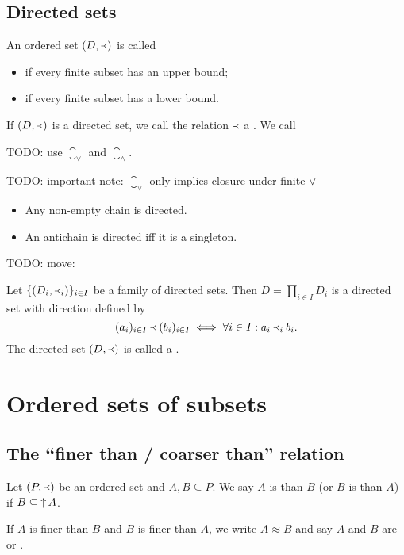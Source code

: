 \subsection{Directed sets}
\begin{definition}
An ordered set $(D,\Yleft)$ is called
\begin{itemize}
\item {} if every finite subset has an upper bound;
\item {} if every finite subset has a lower bound.
\end{itemize}
If $(D,\Yleft)$ is a directed set, we call the relation $\Yleft$ a .
We call 
\end{definition}
TODO: use $\closure_\vee$ and $\closure_\wedge$.

TODO: important note: $\closure_\vee$ only implies closure under finite $\vee$

\begin{example}
\begin{itemize}
\item Any non-empty chain is directed.
\item An antichain is directed iff it is a singleton.
\end{itemize}
\end{example}

TODO: move:
\begin{proposition}
Let $\{(D_i,\Yleft_i)\}_{i\in I}$ be a family of directed sets. Then $D= \prod_{i\in I}D_i$ is a directed set with direction defined by
\[ (a_i)_{i\in I} \Yleft (b_i)_{i\in I} \iff \forall i\in I: a_i\Yleft_i b_i. \]
The directed set $(D,\Yleft)$ is called a .
\end{proposition}


\section{Ordered sets of subsets}
\subsection{The ``finer than / coarser than'' relation}
\begin{definition}
Let $\left( P,\Yleft \right)$ be an ordered set and $A,B \subseteq P$. We say $A$ is  than $B$ (or $B$ is  than $A$) if $B\subseteq \mathop{\uparrow} A$.

If $A$ is finer than $B$ and $B$ is finer than $A$, we write $A \approx B$ and say $A$ and $B$ are  or .
\end{definition}

